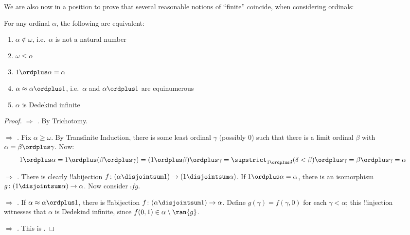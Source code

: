 \documentclass[../../../include/open-logic-section]{subfiles}
\begin{document}
We are also now in a position to prove that several reasonable notions of ``finite'' coincide, when considering ordinals:
\begin{lem}For any ordinal $\alpha$, the following are equivalent:
	\begin{enumerate}
		\item{} $\alpha\notin \omega$, i.e.\ $\alpha$ is not a natural number
		\item{} $\omega \leq \alpha$ 
		\item{} $1 \ordplus  \alpha = \alpha$ %
		\item{} $\alpha \approx \alpha\ordplus 1$, i.e.\ $\alpha$ and $\alpha\ordplus 1$ are equinumerous
		\item{} $\alpha$ is Dedekind infinite	
	\end{enumerate}
\end{lem}
\begin{proof}
	\emph{ $\Rightarrow$ .} By Trichotomy. 
		
	\emph{ $\Rightarrow$ .} Fix $\alpha \geq \omega$. By Transfinite Induction, there is some least ordinal $\gamma$ (possibly $0$) such that there is a limit ordinal $\beta$ with $\alpha = \beta \ordplus \gamma$. Now:
	$$1 \ordplus \alpha =  1 \ordplus (\beta \ordplus \gamma) = (1 \ordplus \beta) \ordplus \gamma =  \supstrict_{1 \ordplus  \delta} (\delta < \beta) \ordplus  \gamma = \beta \ordplus  \gamma = \alpha$$
	
	\emph{ $\Rightarrow$ .} There is clearly !!a{bijection} $f \colon (\alpha \disjointsum 1) \to (1 \disjointsum \alpha)$. If $1 \ordplus \alpha = \alpha$, there is an isomorphism $g \colon (1 \disjointsum \alpha) \to \alpha$. Now consider $\comp{f}{g}$.
	
	\emph{ $\Rightarrow$ .} If $\alpha \approx \alpha \ordplus 1$, there is !!a{bijection} $f \colon (\alpha \disjointsum 1) \to \alpha$. Define $g(\gamma) = f(\gamma, 0)$ for each $\gamma < \alpha$; this !!{injection} witnesses that $\alpha$ is Dedekind infinite, since $f(0,1) \in \alpha \setminus \ran{g}$. 
	
	\emph{ $\Rightarrow$ .} This is .
\end{proof}
\end{document}
